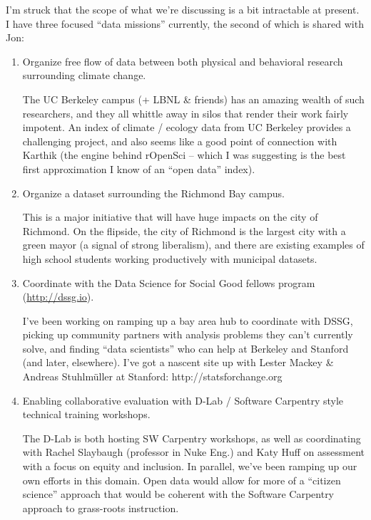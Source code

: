 I'm struck that the scope of what we're discussing is a bit intractable at
present. I have three focused “data missions” currently, the second of which is
shared with Jon:

\begin{enumerate}
    \item Organize free flow of data between both physical and behavioral
        research surrounding climate change.

        The UC Berkeley campus (+ LBNL \& friends) has an amazing wealth of such
        researchers, and they all whittle away in silos that render their work
        fairly impotent. An index of climate / ecology data from UC Berkeley
        provides a challenging project, and also seems like a good point of
        connection with Karthik (the engine behind rOpenSci -- which I was
        suggesting is the best first approximation I know of an “open data”
        index).

    \item Organize a dataset surrounding the Richmond Bay campus.

        This is a major initiative that will have huge impacts on the city of
        Richmond.  On the flipside, the city of Richmond is the largest city
        with a green mayor (a signal of strong liberalism), and there are
        existing examples of high school students working productively with
        municipal datasets.

    \item Coordinate with the Data Science for Social Good fellows program
        (\url{http://dssg.io}).

        I've been working on ramping up a bay area hub to coordinate with DSSG,
        picking up community partners with analysis problems they can't
        currently solve, and finding “data scientists” who can help at Berkeley
        and Stanford (and later, elsewhere). I've got a nascent site up with
        Lester Mackey \& Andreas Stuhlmüller at Stanford:
        http://statsforchange.org

    \item Enabling collaborative evaluation with D-Lab / Software Carpentry style
        technical training workshops.

        The D-Lab is both hosting SW Carpentry workshops, as well as
        coordinating with Rachel Slaybaugh (professor in Nuke Eng.) and Katy
        Huff on assessment with a focus on equity and inclusion. In parallel,
        we've been ramping up our own efforts in this domain. Open data would
        allow for more of a “citizen science” approach that would be coherent
        with the Software Carpentry approach to grass-roots instruction.

\end{enumerate}


